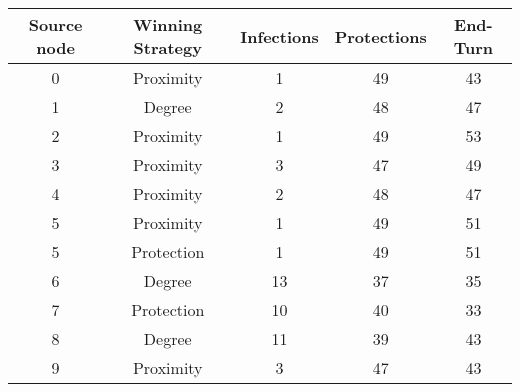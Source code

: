 \documentclass[results.tex]{subfiles}
\begin{document}
    \begin{center}
        \begin{tabular}{| c || c | c | c | c |}
            \hline
            {\bfseries Source node} & {\bfseries Winning Strategy} & {\bfseries Infections} & {\bfseries Protections}
            & {\bfseries End-Turn}
            \\  %
            \hline\hline
            0                       & Proximity                    & 1                      & 49                      & 43                   \\
            \hline
            1                       & Degree                       & 2                      & 48                      & 47                   \\
            \hline
            2                       & Proximity                    & 1                      & 49                      & 53                   \\
            \hline
            3                       & Proximity                    & 3                      & 47                      & 49                   \\
            \hline
            4                       & Proximity                    & 2                      & 48                      & 47                   \\
            \hline
            5                       & Proximity                    & 1                      & 49                      & 51                   \\
            \hline
            5                       & Protection                   & 1                      & 49                      & 51                   \\
            \hline
            6                       & Degree                       & 13                     & 37                      & 35                   \\
            \hline
            7                       & Protection                   & 10                     & 40                      & 33                   \\
            \hline
            8                       & Degree                       & 11                     & 39                      & 43                   \\
            \hline
            9                       & Proximity                    & 3                      & 47                      & 43                   \\

\end{tabular}
\end{center}
\end{document}
